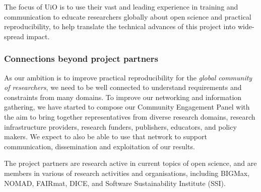 The focus of UiO is to use their vast and leading experience in training
and communication to educate researchers globally about open science and
practical reproducibility, to help translate the technical advances of this
project into wide-spread impact.


\subsubsection{Connections beyond project partners}

As our ambition is to improve practical reproducibility for the \emph{global
  community of researchers}, we need to be well connected to understand
requirements and constraints from many domains. To improve our networking and
information gathering, we have started to compose our Community Engagement Panel
 with the aim to bring together
representatives from diverse research domains, research infrastructure
providers, research funders, publishers, educators, and policy makers. We expect
to also be able to use that network to support communication, dissemination and
exploitation of our results.

The project partners are research active in current topics of open science, and
are members in various of research activities and organisations, including
BIGMax, NOMAD, FAIRmat, DICE, and Software Sustainability Institute (SSI).


% 
